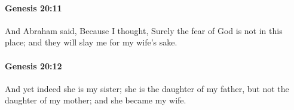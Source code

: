 		\paragraph{Genesis 20:11} %
			\label{GENESIS-20-11}

			And Abraham said, Because I thought, Surely the fear of God is not in this place; and they will slay me for my wife's sake.


		\paragraph{Genesis 20:12} %
			\label{GENESIS-20-12}

			And yet indeed she is my sister; she is the daughter of my father, but not the daughter of my mother; and she became my wife.


